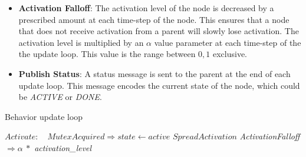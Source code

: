 \documentclass[conference]{article}
\begin{document}
\begin{itemize}
  \item \textbf{Activation Falloff}: The activation level of the node is decreased by a prescribed amount at each time-step of the node. This ensures that a node that does not receive activation from a parent will slowly lose activation. The activation level is multiplied by an $\alpha$ value parameter at each time-step of the the update loop. This value is the range between \(0,1\) exclusive.
  \item \textbf{Publish Status}: A status message is sent to the parent at the end of each update loop. This message encodes the current state of the node, which could be \emph{ACTIVE} or \emph{DONE}. 
\end{itemize}

\begin{algorithm}
\caption{Behavior update loop}
\label{alg:update}
\begin{algorithmic}
      \STATE $Activate:$
        \STATE $~~~Mutex Acquired \Rightarrow state \leftarrow active$
    \ELSE
      \STATE $SpreadActivation$
    \ENDIF
    \STATE \emph{ActivationFalloff} $\Rightarrow \alpha ~*$ \emph{activation\_level}  
  \ENDIF
\ENDIF
\end{algorithmic}
\label{update-loop}
\end{algorithm}



\end{document}
